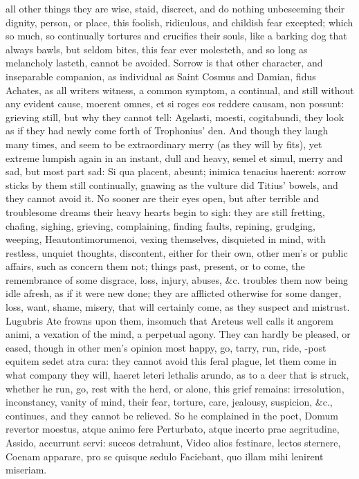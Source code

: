 {all other things they are wise, staid, discreet, and do nothing
unbeseeming their dignity, person, or place, this foolish, ridiculous,
and childish fear excepted; which so much, so continually tortures and
crucifies their souls, like a barking dog that always bawls, but seldom
bites, this fear ever molesteth, and so long as melancholy lasteth,
cannot be avoided.
Sorrow is that other character, and inseparable companion, as
individual as Saint Cosmus and Damian, fidus Achates, as all writers
witness, a common symptom, a continual, and still without any evident
cause, moerent omnes, et si roges eos reddere causam, non
possunt: grieving still, but why they cannot tell: Agelasti, moesti,
cogitabundi, they look as if they had newly come forth of Trophonius'
den. And though they laugh many times, and seem to be extraordinary
merry (as they will by fits), yet extreme lumpish again in an instant,
dull and heavy, semel et simul, merry and sad, but most part sad:
Si qua placent, abeunt; inimica tenacius haerent: sorrow sticks
by them still continually, gnawing as the vulture did Titius'
bowels, and they cannot avoid it. No sooner are their eyes open, but
after terrible and troublesome dreams their heavy hearts begin to sigh:
they are still fretting, chafing, sighing, grieving, complaining,
finding faults, repining, grudging, weeping, Heautontimorumenoi, vexing
themselves, disquieted in mind, with restless, unquiet thoughts,
discontent, either for their own, other men's or public affairs, such
as concern them not; things past, present, or to come, the remembrance
of some disgrace, loss, injury, abuses, \&c. troubles them now being
idle afresh, as if it were new done; they are afflicted otherwise for
some danger, loss, want, shame, misery, that will certainly come, as
they suspect and mistrust. Lugubris Ate frowns upon them, insomuch that
Areteus well calls it angorem animi, a vexation of the mind, a
perpetual agony. They can hardly be pleased, or eased, though in other
men's opinion most happy, go, tarry, run, ride, -post equitem
sedet atra cura: they cannot avoid this feral plague, let them come in
what company they will, haeret leteri lethalis arundo, as to a
deer that is struck, whether he run, go, rest with the herd, or alone,
this grief remains: irresolution, inconstancy, vanity of mind, their
fear, torture, care, jealousy, suspicion, \&c., continues, and they
cannot be relieved. So he complained in the poet,
Domum revertor moestus, atque animo fere
Perturbato, atque incerto prae aegritudine,
Assido, accurrunt servi: succos detrahunt,
Video alios festinare, lectos sternere,
Coenam apparare, pro se quisque sedulo
Faciebant, quo illam mihi lenirent miseriam.

}

